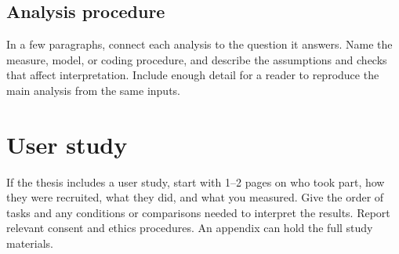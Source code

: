 
\subsection{Analysis procedure}
In a few paragraphs, connect each analysis to the question it answers. Name the measure, model, or coding procedure, and describe the assumptions and checks that affect interpretation. Include enough detail for a reader to reproduce the main analysis from the same inputs. 

\section{User study}
If the thesis includes a user study, start with 1--2 pages on who took part, how they were recruited, what they did, and what you measured. Give the order of tasks and any conditions or comparisons needed to interpret the results. Report relevant consent and ethics procedures. An appendix can hold the full study materials.